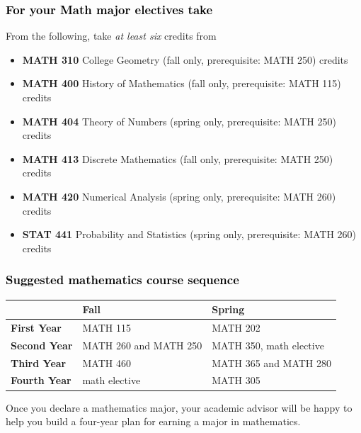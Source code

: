 \documentclass[10pt]{article}
\newcommand{\calconeshort}{MATH 115}
\newcommand{\calctwoshort}{MATH 202}
\newcommand{\foundationsshort}{MATH 250}
\newcommand{\calcthreeshort}{MATH 260}
\newcommand{\linearshort}{MATH 280}
\newcommand{\discrete}{\textbf{MATH 413} Discrete Mathematics  (fall only, prerequisite: MATH 250)\dotfill 3 credits}
\newcommand{\statistics}{\textbf{STAT 441} Probability and Statistics (spring only, prerequisite: MATH 260)  \dotfill  3 credits}
\newcommand{\diffeqshort}{MATH 305}
\newcommand{\abstractalgebrashort}{MATH 350}
\newcommand{\complexshort}{MATH 365}
\newcommand{\advancedcalcshort}{MATH 460}
\newcommand{\numerical}{\textbf{MATH 420}   Numerical Analysis   (spring only, prerequisite: MATH 260)\dotfill 3 credits}
\newcommand{\collegegeometry}{\textbf{MATH 310}	College Geometry (fall only,  prerequisite: MATH 250) \dotfill 3 credits}
\newcommand{\mathhistory}{\textbf{MATH 400} History of Mathematics (fall only,  prerequisite: MATH 115) \dotfill 3 credits}
\newcommand{\numbertheory}{\textbf{MATH 404} Theory of Numbers (spring only,  prerequisite: MATH 250) \dotfill 3 credits}
\newcommand{\mathBS}{
         \begin{tabular}[h]{| l | l | l|} 
            \hline
                       & \textbf{Fall}         &  \textbf{Spring}  \\ \hline 
            \textbf{First Year} & \calconeshort{}  & \calctwoshort \\  \hline
            \textbf{Second Year} &  \calcthreeshort{} and  \foundationsshort & \abstractalgebrashort, math elective \\ \hline
            \textbf{Third Year} & \advancedcalcshort              &  \complexshort{} and \linearshort \\ \hline
            \textbf{Fourth Year} & math elective &  \diffeqshort  \\ \hline
         \end{tabular}}
\begin{document}
\subsubsection*{\textcolor{black}{For your Math major electives take}}

From the following, take \emph{at least six} credits from
\vspace{0.1in}

\begin{itemize}
\item \collegegeometry
\item \mathhistory
\item \numbertheory
\item \discrete
\item \numerical
\item \statistics
\end{itemize}




\subsubsection*{\textcolor{black}{Suggested mathematics course sequence}}

\mathBS


  \vspace{0.1in}

 \noindent Once you declare a mathematics major, your academic advisor will be happy to help you build a four-year plan for earning a major in mathematics.

   \vspace{0.1in}
\end{document}
